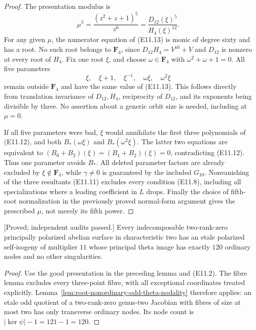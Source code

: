 \begin{proof}
The presentation modulus is
\[
 \mu^5=\frac{(z^2+z+1)^5}{z^6}
       =\frac{D_{12}(\xi)^5}{H_4(\xi)^{12}}.                  \tag{E11.13}
\]
For any given $\mu$, the numerator equation of (E11.13) is monic of
degree sixty and has a root. No such root belongs to $\mathbf F_4$,
since $D_{12}H_4=V^{16}+V$ and $D_{12}$ is nonzero at every root
of $H_4$. Fix one root $\xi$, and choose
$\omega\in\mathbf F_4$ with $\omega^2+\omega+1=0$.
All five parameters
\[
             \xi,\quad \xi+1,\quad \xi^{-1},
                    \quad \omega\xi,\quad \omega^2\xi
\]
remain outside $\mathbf F_4$ and have the same value of (E11.13).
This follows directly from translation invariance of $D_{12},H_4$,
reciprocity of $D_{12}$, and its exponents being divisible by three.
No assertion about a generic orbit size is needed, including at
$\mu=0$.

If all five parameters were bad, $\xi$ would annihilate the first
three polynomials of (E11.12), and both $B_*(\omega\xi)$ and
$B_*(\omega^2\xi)$. The latter two equations are equivalent to
$(B_0+B_2)(\xi)=(B_1+B_2)(\xi)=0$, contradicting (E11.12).
Thus one parameter avoids $B_*$. All deleted parameter factors are
already excluded by $\xi\notin\mathbf F_4$, while $\gamma\ne0$
is guaranteed by the included $G_{10}$. Nonvanishing of the three
resultants (E11.11) excludes every condition (E11.8), including all
specializations where a leading coefficient in $L$ drops.
Finally the choice of fifth-root normalization in the previously
proved normal-form argument gives the prescribed $\mu$, not merely
its fifth power.
\end{proof}

\begin{theorem}
\label{thm:uniform-eleven-nodal-self-isogeny-candidate}
\textup{[Proved; independent audits passed.]}
Every indecomposable two-rank-zero principally polarized abelian surface
in characteristic two has an etale polarized self-isogeny of multiplier
$11$ whose principal theta image has exactly $120$ ordinary nodes and
no other singularities.
\end{theorem}
\begin{proof}
Use the good presentation in the preceding lemma and (E11.2).
The fibre lemma excludes every three-point fibre, with all exceptional
coordinates treated explicitly. Lemma~\ref{lem:root-nonordinary-odd-theta-nodality}
therefore applies: an etale odd quotient of a two-rank-zero genus-two
Jacobian with fibres of size at most two has only transverse ordinary
nodes. Its node count is $|\ker\psi|-1=121-1=120$.
\end{proof}

